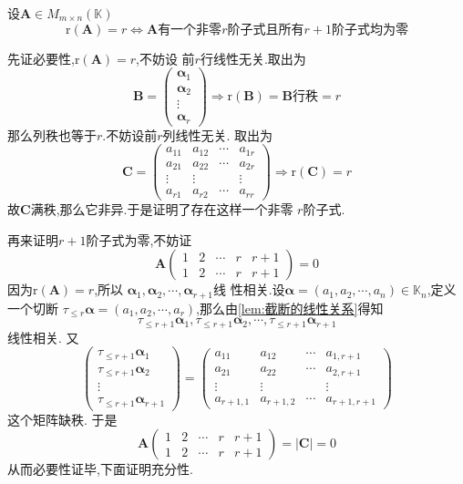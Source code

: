\begin{formal}
\begin{theorem}[子式判别法]\label{thm:子式判别法}
    设$\bm{A} \in M_{m \times n}
    \left(\mathbb{K}\right)$
    \[
        \mathrm{r}\left(\bm{A}\right)
        = r \Longleftrightarrow 
        \bm{A}\text{有一个非零}
        r\text{阶子式且所有}r+1
        \text{阶子式均为零}
    \]
\end{theorem}
\begin{Proof}
先证必要性,$\mathrm{r}\left(\bm{A}\right)=r$,不妨设
前$r$行线性无关.取出为
\[
\bm{B}=\begin{pmatrix}
    \bm{\alpha}_1\\
    \bm{\alpha}_2\\
    \vdots\\
    \bm{\alpha}_r
\end{pmatrix}
\Longrightarrow \mathrm{r}\left(\bm{B}\right)=\bm{B}\text{行秩}=r
\]
那么列秩也等于$r$.不妨设前$r$列线性无关.
取出为
\[
\bm{C}
=
\begin{pmatrix}
    a_{11}&a_{12}&\cdots&a_{1r}\\
    a_{21}&a_{22}&\cdots&a_{2r}\\
    \vdots&\vdots&&\vdots\\
    a_{r1}&a_{r2}&\cdots&a_{rr}
\end{pmatrix}\Longrightarrow \mathrm{r}\left(\bm{C}\right)=r
\]
故$\bm{C}$满秩,那么它非异.于是证明了存在这样一个非零
$r$阶子式.

再来证明$r+1$阶子式为零,不妨证
\[
\bm{A}\begin{pmatrix}
    1&2&\cdots&r&r+1\\
    1&2&\cdots&r&r+1
\end{pmatrix}=0
\]
因为$\mathrm{r}\left(\bm{A}\right)=r$,所以
$\bm{\alpha}_1,\bm{\alpha}_{2},\cdots,\bm{\alpha}_{r+1}$线
性相关.设$\bm{\alpha}=\left(a_1,a_2,\cdots,a_n\right)\in \mathbb{K}_n$,定义一个切断
$\tau _{\leqslant r}\bm{\alpha}=\left(a_1,a_2,\cdots,
a_r\right)$,那么由\cref{lem:截断的线性关系}得知
\[
\tau_{\leqslant r+1}\bm{\alpha}_1,\tau_{\leqslant r+1}\bm{\alpha}_2,
\cdots,\tau_{\leqslant r+1}\bm{\alpha}_{r+1}
\]
线性相关.
又
\[
\begin{pmatrix}
   \tau_{\leqslant r+1}\bm{\alpha}_1\\
   \tau_{\leqslant r+1}\bm{\alpha}_2\\
   \vdots\\
\tau_{\leqslant r+1}\bm{\alpha}_{r+1} 
\end{pmatrix}=
\begin{pmatrix}
    a_{11}&a_{12}&\cdots&a_{1,r+1}\\
    a_{21}&a_{22}&\cdots&a_{2,r+1}\\
    \vdots&\vdots&&\vdots\\
    a_{r+1,1}&a_{r+1,2}&\cdots&a_{r+1,r+1}
\end{pmatrix}
\]
这个矩阵缺秩.
于是
\[
\bm{A}\begin{pmatrix}
    1&2&\cdots&r&r+1\\
    1&2&\cdots&r&r+1
\end{pmatrix}=\left|\bm{C}\right|=0
\]
从而必要性证毕,下面证明充分性.


\end{Proof}
\end{formal}

